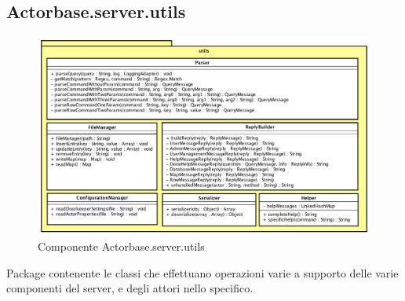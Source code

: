 \documentclass[a4paper]{article}
\begin{document}
	\subsection{Actorbase.server.utils}
		\begin{figure}[H]
			\centering
			\includegraphics[width=\textwidth]{Server/utilsLevel.jpg}
			\caption{Componente Actorbase.server.utils}
		\end{figure}
		Package contenente le classi che effettuano operazioni varie a supporto delle varie componenti del server, e degli attori nello specifico.
		
			
\end{document}
